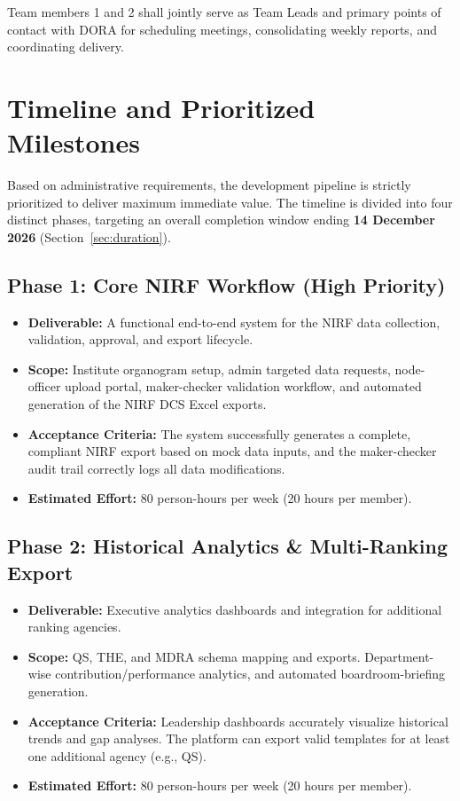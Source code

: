 \documentclass[11pt]{article}
\begin{document}
Team members 1 and 2 shall jointly serve as Team Leads and primary points of contact with DORA for scheduling meetings, consolidating weekly reports, and coordinating delivery.

\section{Timeline and Prioritized Milestones}
\label{sec:timeline}
Based on administrative requirements, the development pipeline is strictly prioritized to deliver maximum immediate value. The timeline is divided into four distinct phases, targeting an overall completion window ending \textbf{14 December 2026} (Section~\ref{sec:duration}).

\subsection{Phase 1: Core NIRF Workflow (High Priority)}
\begin{itemize}[leftmargin=1.4em, itemsep=3pt]
\item \textbf{Deliverable:} A functional end-to-end system for the NIRF data collection, validation, approval, and export lifecycle.
\item \textbf{Scope:} Institute organogram setup, admin targeted data requests, node-officer upload portal, maker-checker validation workflow, and automated generation of the NIRF DCS Excel exports.
\item \textbf{Acceptance Criteria:} The system successfully generates a complete, compliant NIRF export based on mock data inputs, and the maker-checker audit trail correctly logs all data modifications.
\item \textbf{Estimated Effort:} 80 person-hours per week (20 hours per member).
\end{itemize}

\subsection{Phase 2: Historical Analytics \& Multi-Ranking Export}
\begin{itemize}[leftmargin=1.4em, itemsep=3pt]
\item \textbf{Deliverable:} Executive analytics dashboards and integration for additional ranking agencies.
\item \textbf{Scope:} QS, THE, and MDRA schema mapping and exports. Department-wise contribution/performance analytics, and automated boardroom-briefing generation.
\item \textbf{Acceptance Criteria:} Leadership dashboards accurately visualize historical trends and gap analyses. The platform can export valid templates for at least one additional agency (e.g., QS).
\item \textbf{Estimated Effort:} 80 person-hours per week (20 hours per member).
\end{itemize}
\end{document}
